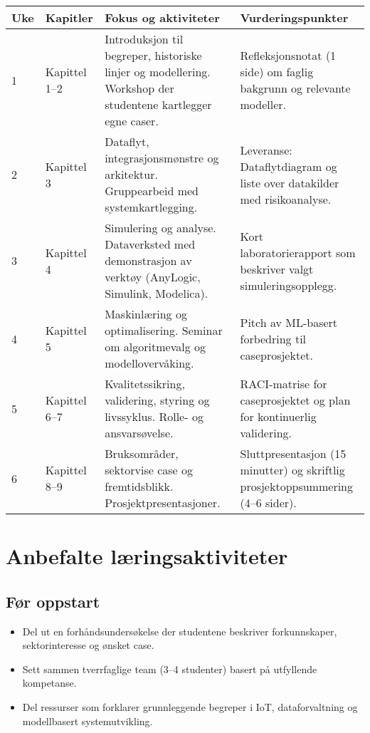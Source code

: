 \begin{tabular}{p{1.3cm}p{4cm}p{5.2cm}p{4cm}}
\toprule
\textbf{Uke} & \textbf{Kapitler} & \textbf{Fokus og aktiviteter} & \textbf{Vurderingspunkter} \\
\midrule
1 & Kapittel 1--2 & Introduksjon til begreper, historiske linjer og modellering. Workshop der studentene kartlegger egne caser. & Refleksjonsnotat (1 side) om faglig bakgrunn og relevante modeller. \\
2 & Kapittel 3 & Dataflyt, integrasjonsmønstre og arkitektur. Gruppearbeid med systemkartlegging. & Leveranse: Dataflytdiagram og liste over datakilder med risikoanalyse. \\
3 & Kapittel 4 & Simulering og analyse. Dataverksted med demonstrasjon av verktøy (AnyLogic, Simulink, Modelica). & Kort laboratorierapport som beskriver valgt simuleringsopplegg. \\
4 & Kapittel 5 & Maskinlæring og optimalisering. Seminar om algoritmevalg og modellovervåking. & Pitch av ML-basert forbedring til caseprosjektet. \\
5 & Kapittel 6--7 & Kvalitetssikring, validering, styring og livssyklus. Rolle- og ansvarsøvelse. & RACI-matrise for caseprosjektet og plan for kontinuerlig validering. \\
6 & Kapittel 8--9 & Bruksområder, sektorvise case og fremtidsblikk. Prosjektpresentasjoner. & Sluttpresentasjon (15 minutter) og skriftlig prosjektoppsummering (4--6 sider). \\
\bottomrule
\end{tabular}

\section{Anbefalte læringsaktiviteter}
\subsection{Før oppstart}
\begin{itemize}
    \item Del ut en forhåndsundersøkelse der studentene beskriver forkunnskaper, sektorinteresse og ønsket case.
    \item Sett sammen tverrfaglige team (3--4 studenter) basert på utfyllende kompetanse.
    \item Del ressurser som forklarer grunnleggende begreper i IoT, dataforvaltning og modellbasert systemutvikling.
\end{itemize}

